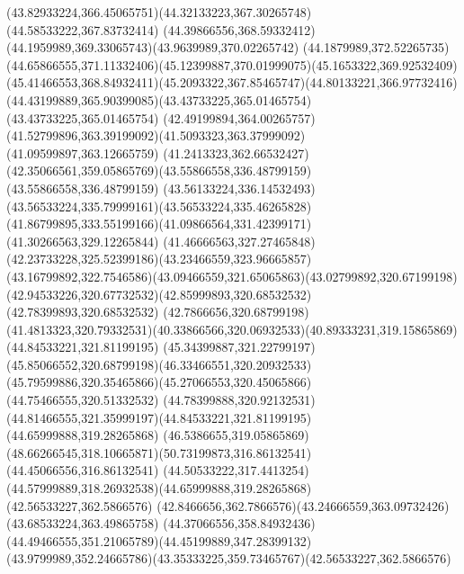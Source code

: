 {{\curveto(43.82933224,366.45065751)(44.32133223,367.30265748)(44.58533222,367.83732414)
\curveto(44.39866556,368.59332412)(44.1959989,369.33065743)(43.9639989,370.02265742)
\lineto(44.1879989,372.52265735)
\curveto(44.65866555,371.11332406)(45.12399887,370.01999075)(45.1653322,369.92532409)
\curveto(45.41466553,368.84932411)(45.2093322,367.85465747)(44.80133221,366.97732416)
\curveto(44.43199889,365.90399085)(43.43733225,365.01465754)(43.43733225,365.01465754)
\curveto(42.49199894,364.00265757)(41.52799896,363.39199092)(41.5093323,363.37999092)
\lineto(41.09599897,363.12665759)
\lineto(41.2413323,362.66532427)
\curveto(42.35066561,359.05865769)(43.55866558,336.48799159)(43.55866558,336.48799159)
\curveto(43.56133224,336.14532493)(43.56533224,335.79999161)(43.56533224,335.46265828)
\curveto(41.86799895,333.55199166)(41.09866564,331.42399171)(41.30266563,329.12265844)
\curveto(41.46666563,327.27465848)(42.23733228,325.52399186)(43.23466559,323.96665857)
\curveto(43.16799892,322.7546586)(43.09466559,321.65065863)(43.02799892,320.67199198)
\curveto(42.94533226,320.67732532)(42.85999893,320.68532532)(42.78399893,320.68532532)
\lineto(42.7866656,320.68799198)
\curveto(41.4813323,320.79332531)(40.33866566,320.06932533)(40.89333231,319.15865869)
\moveto(44.84533221,321.81199195)
\curveto(45.34399887,321.22799197)(45.85066552,320.68799198)(46.33466551,320.20932533)
\curveto(45.79599886,320.35465866)(45.27066553,320.45065866)(44.75466555,320.51332532)
\curveto(44.78399888,320.92132531)(44.81466555,321.35999197)(44.84533221,321.81199195)
\moveto(44.65999888,319.28265868)
\curveto(46.5386655,319.05865869)(48.66266545,318.10665871)(50.73199873,316.86132541)
\lineto(44.45066556,316.86132541)
\curveto(44.50533222,317.4413254)(44.57999889,318.26932538)(44.65999888,319.28265868)
\moveto(42.56533227,362.5866576)
\curveto(42.8466656,362.7866576)(43.24666559,363.09732426)(43.68533224,363.49865758)
\curveto(44.37066556,358.84932436)(44.49466555,351.21065789)(44.45199889,347.28399132)
\curveto(43.9799989,352.24665786)(43.35333225,359.73465767)(42.56533227,362.5866576)
}
}

